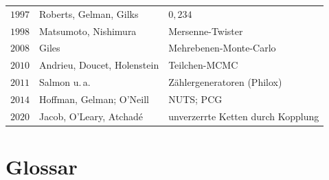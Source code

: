 \begin{merksatz}
\begin{center}
{\begin{tabular}{@{}P{1.0cm}P{3.4cm}P{4.2cm}@{}}
$1997$ & Roberts, Gelman, Gilks & $0{,}234$\\
$1998$ & Matsumoto, Nishimura & Mersenne-Twister\\
$2008$ & Giles & Mehrebenen-Monte-Carlo\\
$2010$ & Andrieu, Doucet, Holenstein & Teilchen-MCMC\\
$2011$ & Salmon u.\,a. & Zählergeneratoren (Philox)\\
$2014$ & Hoffman, Gelman; O'Neill & NUTS; PCG\\
$2020$ & Jacob, O'Leary, Atchadé & unverzerrte Ketten durch Kopplung\\
\bottomrule
\end{tabular}}
\end{center}
\end{merksatz}

\section{Glossar}

